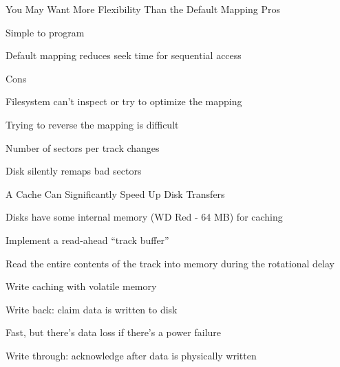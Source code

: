   \begin{frame}{You May Want More Flexibility Than the Default Mapping}
    Pros

    \hspace{2em} Simple to program

    \hspace{2em} Default mapping reduces seek time for sequential access

    \vspace{2em}

    Cons

    \hspace{2em} Filesystem can't inspect or try to optimize the mapping

    \hspace{2em} Trying to reverse the mapping is difficult

    \hspace{4em} Number of sectors per track changes

    \hspace{4em} Disk silently remaps bad sectors
  \end{frame}

  \begin{frame}{A Cache Can Significantly Speed Up Disk Transfers}

    Disks have some internal memory (WD Red - 64 MB) for caching

    \vspace{2em}

    Implement a read-ahead ``track buffer''

    \hspace{2em} Read the entire contents of the track into memory during the rotational delay

    \vspace{2em}

    Write caching with volatile memory

    \hspace{2em} Write back: claim data is written to disk

    \hspace{4em} Fast, but there's data loss if there's a power failure

    \hspace{4em} Write through: acknowledge after data is physically written
  \end{frame}



